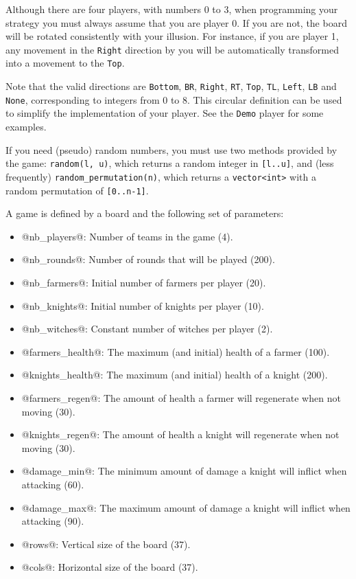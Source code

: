\medskip Although there are four players, with numbers 0 to 3, when
programming your strategy you must always assume that you are player 0.
If you are not, the board will be rotated consistently with your
illusion. For instance, if you are player 1, any movement in the
\texttt{Right} direction by you will be automatically transformed into
a movement to the \texttt{Top}.

\medskip Note that the valid directions are
\texttt{Bottom}, \texttt{BR}, \texttt{Right}, \texttt{RT}, \texttt{Top},
\texttt{TL}, \texttt{Left}, \texttt{LB} and \texttt{None},
corresponding to integers from 0 to 8.
This circular definition can be used
to simplify the implementation of your player.
See the \texttt{Demo} player for some examples.

\medskip If you need (pseudo) random numbers,
you must use two methods provided by the game:
\texttt{random(l, u)}, which returns a random integer in \texttt{[l..u]},
and (less frequently) \texttt{random\_permutation(n)},
which returns a \texttt{vector<int>}
with a random permutation of \texttt{[0..n-1]}.

\medskip A game is defined by a board and the following set of parameters:

\begin{itemize}
  \item @nb_players@: Number of teams in the game (4).
  \item @nb_rounds@: Number of rounds that will be played (200).
  \item @nb_farmers@: Initial number of farmers per player (20).
  \item @nb_knights@: Initial number of knights per player (10).
  \item @nb_witches@: Constant number of witches per player (2).
  \item @farmers_health@: The maximum (and initial) health of a farmer (100).
  \item @knights_health@: The maximum (and initial) health of a knight (200).
  \item @farmers_regen@: The amount of health a farmer will regenerate when not moving (30).
  \item @knights_regen@: The amount of health a knight will regenerate when not moving (30).
  \item @damage_min@: The minimum amount of damage a knight will inflict when attacking (60).
  \item @damage_max@: The maximum amount of damage a knight will inflict when attacking (90).
  \item @rows@: Vertical size of the board (37).
  \item @cols@: Horizontal size of the board (37).
\end{itemize}

